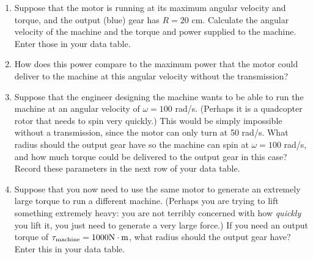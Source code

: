 \documentclass[12pt]{article}
\begin{document}
\begin{enumerate}
\vspace{2in}

\item  Suppose that the motor is running at its maximum angular velocity and torque, and the output (blue) gear has $R=20$ cm. Calculate the angular velocity of the machine and the torque and power supplied to the machine. Enter those in your data table.


\item How does this power compare to the maximum power that the motor could deliver to the machine at this angular velocity without the transmission?


\vspace{1.5in}


\item Suppose that the engineer designing the machine wants to be able to run the machine at an angular velocity of $\omega = 100$ rad/s. (Perhaps
	it is a quadcopter rotor that needs to spin very quickly.) This would be simply impossible without a transmission, since the motor can only turn at 50 rad/s. What radius should the output gear have so the machine can spin at $\omega = 100$ rad/s, and how much torque could be delivered to the output
	gear in this case? Record these parameters in the next row of your data table.


\vspace{2.5in}


\item Suppose that you now need to use the same motor to generate an extremely large torque to run a different machine. (Perhaps you are trying to lift something extremely heavy: you are not terribly concerned with how {\it quickly} you lift it, you just need to generate a very large force.) If you need an output torque of $\tau_{\rm{machine}} = 1000 \rm N \cdot \rm m$, what radius should the output gear have? Enter this in your data table.



\end{enumerate}
\end{document}
